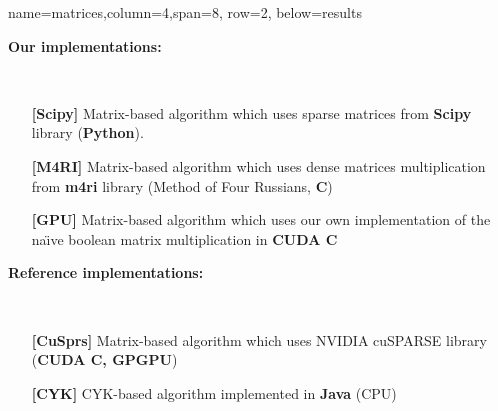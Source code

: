 \documentclass[a0paper,portrait]{baposter}
\begin{document}
\begin{poster}


{name=matrices,column=4,span=8, row=2, below=results}%
{
\textbf{Our implementations:}\\
\begin{minipage}[t]{0.4cm}
\hspace{0.4cm}
\end{minipage}
~
\begin{minipage}[t]{0.95\textwidth}
\begin{itemize}
\item[\textbf{[Scipy]}] Matrix-based algorithm which uses sparse matrices from \textbf{Scipy} library (\textbf{Python}).
\item[\textbf{[M4RI]}] Matrix-based algorithm which uses dense matrices multiplication from \textbf{m4ri} library (Method of Four Russians, \textbf{C})
\item[\textbf{[GPU]}] Matrix-based algorithm which uses our own implementation of the na\"{\i}ve boolean matrix multiplication in \textbf{CUDA C}
\end{itemize}
\end{minipage}

\vspace{0.5cm}
\textbf{Reference implementations:}\\
\begin{minipage}[t]{0.6cm}
\hspace{0.6cm}
\end{minipage}
~
\begin{minipage}[t]{0.95\textwidth}
\begin{itemize}
\item[\textbf{[CuSprs]}] Matrix-based algorithm which uses NVIDIA cuSPARSE library (\textbf{CUDA C, GPGPU})
\item[\textbf{[CYK]}]  CYK-based algorithm implemented in \textbf{Java} (CPU)


\end{itemize}
\end{minipage}}
\end{poster}
\end{document}
